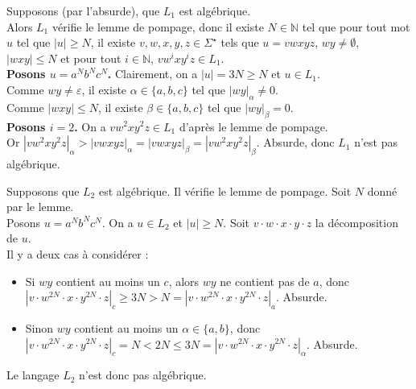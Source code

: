 \begin{corrections}
  \begin{questions}
  \item Supposons (par l'absurde), que $L_1$ est algébrique.\\
    Alors $L_1$ vérifie le lemme de pompage, donc il existe $N \in \mathbb{N}$ tel que pour tout mot $u$ tel que $|u|\ge N$,
    il existe $v, w, x, y, z \in \Sigma^\star$ tels que $u=vwxyz$, $wy\neq \emptyset$, $|wxy| \le N$ et pour tout $i\in \mathbb{N}$, $vw^ixy^i z\in L_1$. \\
    \textbf{Posons $u = a^Nb^Nc^N$. } Clairement, on a $|u| = 3N \ge N$ et $u\in L_1$.\\
    Comme $wy\neq\varepsilon$, il existe $\alpha \in \{a, b, c\}$ tel que $|wy|_\alpha \neq 0$.\\
    Comme $|wxy| \le N$, il existe $\beta \in \{a, b, c\}$ tel que $|wy|_\beta = 0$.\\
    \textbf{Posons $i = 2$. } On a $v w^2 x y^2 z \in L_1$ d'après le lemme de pompage.\\
    Or $|v w^2 x y^2 z|_\alpha > |v w x y z|_\alpha = |v w x y z|_\beta = |v w^2 x y^2 z|_\beta$.
    Absurde, donc $L_1$ n'est pas algébrique. 
  \item Supposons que $L_2$ est algébrique. Il vérifie le lemme de pompage. Soit $N$ donné par le lemme. \\
    Posons $u = a^N b^N c^N$. On a $u \in L_2$ et $|u| \ge N$. Soit $v \cdot  w\cdot x\cdot y\cdot z$ la décomposition de $u$. \\
    Il y a deux cas à considérer :
    \begin{itemize}
    \item Si $w y$ contient au moins un $c$, alors $w y$ ne contient pas de $a$, donc \\ $|v \cdot  w^{2N}\cdot x\cdot y^{2N}\cdot z|_c \ge 3N > N = |v \cdot  w^{2N}\cdot x\cdot y^{2N}\cdot z|_a$. Absurde.
    \item Sinon $w y$ contient au moins un $\alpha\in \{a, b\}$, donc \\ $|v \cdot  w^{2N}\cdot x\cdot y^{2N}\cdot z|_c = N < 2N \le  3N = |v \cdot  w^{2N}\cdot x\cdot y^{2N}\cdot z|_\alpha$. Absurde.
    \end{itemize}
    Le langage $L_2$ n'est donc pas algébrique.
  \end{questions}

\end{corrections}

\endgroup
\endinput
